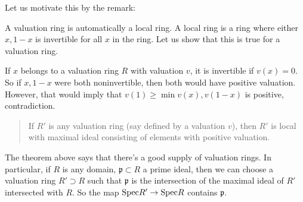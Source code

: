 Let us motivate this by the remark:
\begin{remark} 
A valuation ring is automatically a local ring. A local ring is a ring where
either $x, 1-x$ is invertible for all $x$ in the ring. Let us show that this is
true for a valuation ring. 

If $x $ belongs to a valuation ring $R$ with valuation $v$, it is invertible if
$v(x)=0$.  So if $x, 1-x$ were both noninvertible, then both would have
positive valuation.  However, that would imply that $v(1) \geq \min v(x),
v(1-x)$ is positive, contradiction.
\end{remark} 

\begin{quote}
If $R'$ is any valuation ring (say defined by a valuation $v$), then $R'$ is
local with maximal ideal consisting of elements with positive valuation. 
\end{quote}

The theorem above says that there's a good supply of valuation rings.
In particular, if $R$ is any domain, $\mathfrak{p} \subset R$ a prime ideal,
then we can choose a valuation ring $R' \supset R$ such that $\mathfrak{p}$ is
the intersection of the maximal ideal of $R'$ intersected with $R$.
So the map $\mathrm{Spec} R' \to \mathrm{Spec} R$ contains $\mathfrak{p}$.

